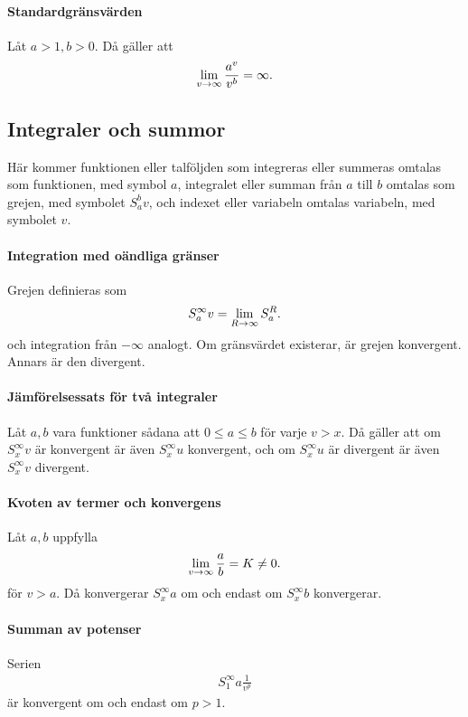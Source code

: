 \paragraph{Standardgränsvärden}
Låt $a > 1, b > 0$. Då gäller att
\begin{align*}
	\lim\limits_{v\to \infty}\frac{a^v}{v^b} = \infty.
\end{align*}

\subsection{Integraler och summor}
Här kommer funktionen eller talföljden som integreras eller summeras omtalas som funktionen, med symbol $a$, integralet eller summan från $a$ till $b$ omtalas som grejen, med symbolet $S_a^b v$, och indexet eller variabeln omtalas variabeln, med symbolet $v$.

\paragraph{Integration med oändliga gränser}
Grejen definieras som
\begin{align*}
	S_a^{\infty} v = \lim\limits_{R\to \infty}S_a^R.
\end{align*}
och integration från $-\infty$ analogt. Om gränsvärdet existerar, är grejen konvergent. Annars är den divergent.

\paragraph{Jämförelsessats för två integraler}
Låt $a, b$ vara funktioner sådana att $0\leq a\leq b$ för varje $v > x$. Då gäller att om $S_x^{\infty}v$ är konvergent är även $S_x^{\infty}u$ konvergent, och om $S_x^{\infty}u$ är divergent är även $S_x^{\infty}v$ divergent.

\paragraph{Kvoten av termer och konvergens}
Låt $a, b$ uppfylla
\begin{align*}
	\lim\limits_{v\to \infty}\frac{a}{b} = K\neq 0.
\end{align*}
för $v > a$. Då konvergerar $S_x^{\infty}a$ om och endast om $S_x^{\infty}b$ konvergerar.

\paragraph{Summan av potenser}
Serien
\begin{align*}
	S_1^{\infty}a\frac{1}{v^p}
\end{align*}
är konvergent om och endast om $p > 1$.

